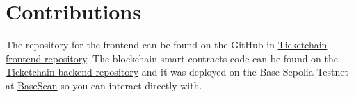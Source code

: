 \section{Contributions}

The repository for the frontend can be found on the GitHub in
\href{https://github.com/Krfld/Ticketchain}{Ticketchain frontend repository}.
The blockchain smart contracts code can be found on the
\href{https://github.com/Krfld/Ticketchain-Foundry}{Ticketchain backend
    repository} and it was deployed on the Base Sepolia Testnet at
\href{https://sepolia.basescan.org/address/0x87f4a5c17c2d3dc48f8e19d81e319230fa28f20d}{BaseScan}
so you can interact directly with.
